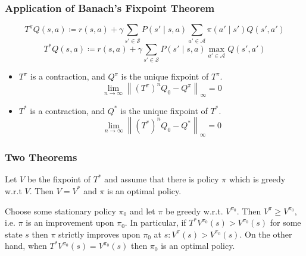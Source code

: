 \documentclass[UTF8,11pt,colorlinks,compress,openany]{beamer}%
\begin{document}
\begin{frame}\frametitle{Application of Banach's Fixpoint Theorem}
\setlength\abovedisplayskip{0pt}
\setlength\belowdisplayskip{0pt}
	\begin{block}{}
		\[T^\pi Q(s,a)\coloneqq r(s,a)+\gamma\sum\limits_{s'\in\mathcal{S}}P(s'\mid s,a)\sum\limits_{a'\in\mathcal{A}}\pi(a'\mid s')Q(s',a')\]
		\[T^* Q(s,a)\coloneqq r(s,a)+\gamma\sum\limits_{s'\in\mathcal{S}}P(s'\mid s,a)\max\limits_{a'\in\mathcal{A}}Q(s',a')\]
		\begin{itemize}
			\item $T^\pi$ is a contraction, and $Q^\pi$ is the unique fixpoint of $T^\pi$.
			\[\lim\limits_{n\to\infty}\left\|(T^\pi)^nQ_0-Q^\pi\right\|_\infty=0\]
			\item $T^*$ is a contraction, and $Q^*$ is the unique fixpoint of $T^*$.
			\[\lim\limits_{n\to\infty}\left\|(T^*)^nQ_0-Q^*\right\|_\infty=0\]
		\end{itemize}
	\end{block}
\end{frame}

\begin{frame}\frametitle{Two Theorems}
	\begin{theorem}
		Let $V$ be the fixpoint of $T^*$ and assume that there is policy $\pi$ which is greedy w.r.t $V$. Then $V=V^*$ and $\pi$ is an optimal policy.
	\end{theorem}
	\begin{theorem}
		Choose some stationary policy $\pi_0$ and let $\pi$ be
		greedy w.r.t. $V^{\pi_0}$. Then $V^\pi\geq V^{\pi_0}$, i.e. $\pi$ is an improvement upon $\pi_0$. In particular, if $T^*V^{\pi_0}(s)>V^{\pi_0}(s)$ for some state $s$ then $\pi$ strictly improves upon $\pi_0$ at $s: V^\pi(s)>V^{\pi_0}(s)$. On the other hand, when $T^*V^{\pi_0}(s)=V^{\pi_0}(s)$ then $\pi_0$ is an optimal policy.
	\end{theorem}
\end{frame}
\end{document}
